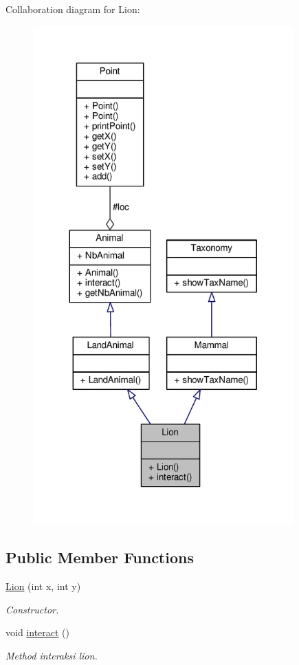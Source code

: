 Collaboration diagram for Lion\+:
\nopagebreak
\begin{figure}[H]
\begin{center}
\leavevmode
\includegraphics[width=284pt]{classLion__coll__graph}
\end{center}
\end{figure}
\subsection*{Public Member Functions}
\begin{DoxyCompactItemize}
\item 
\hyperlink{classLion_a225819c524decec8694b1c651923aa5f}{Lion} (int x, int y)
\begin{DoxyCompactList}\small\item\em Constructor. \end{DoxyCompactList}\item 
void \hyperlink{classLion_a4e12205d48a96d7cc32c8fa45cd1f5e0}{interact} ()\hypertarget{classLion_a4e12205d48a96d7cc32c8fa45cd1f5e0}{}\label{classLion_a4e12205d48a96d7cc32c8fa45cd1f5e0}

\begin{DoxyCompactList}\small\item\em Method interaksi lion. \end{DoxyCompactList}\end{DoxyCompactItemize}
